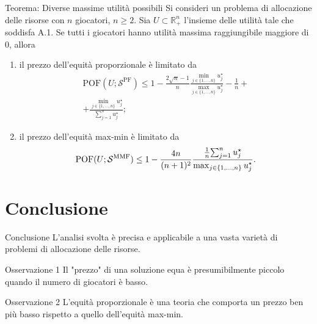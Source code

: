 \documentclass{beamer}
\begin{document}
\begin{frame}
	\begin{exampleblock}{Teorema: Diverse massime utilità possibili}
		\vspace{-0.1cm}
		Si consideri un problema di allocazione delle risorse con $n$ giocatori, $n \ge 2$. Sia $U \subset \mathbb{R}^n_+$ l'insieme delle utilità tale che soddisfa A.1. Se tutti i giocatori hanno utilità massima raggiungibile maggiore di $0$, allora
		\vspace{-0.1cm}
		\begin{enumerate}
			\item il prezzo dell'equità proporzionale è limitato da
			\vspace{-0.3cm}
			\begin{multline}
				\text{POF}(U;\mathcal{S}^{\text{PF}}) \le 1 - \frac{2 \sqrt{n} - 1}{n} \frac{\min_{j \in \{1,\dots,n\}} u_j^{\star} }{\max_{j \in \{1,\dots,n\}} u_j^{\star}} - \frac{1}{n} + \\ + \frac{\min_{j \in \{1,\dots,n\}} u_j^{\star}}{\sum_{j=1}^n u_j^{\star}};
			\end{multline}
			\item il prezzo dell'equità max-min è limitato da
			\vspace{-0.3cm}
			\begin{equation}
				\text{POF}(U;\mathcal{S}^{\text{MMF}}) \le 1 - \frac{4n}{(n+1)^2} \frac{\frac{1}{n}{\sum_{j=1}^n u_j^{\star}}}{\max_{j \in \{1,\dots,n\}} u_j^{\star}}.
				\vspace{-0.3cm}
			\end{equation}
		\end{enumerate}
	\vspace{-0.1cm}
	\end{exampleblock}
\end{frame}

\section{Conclusione}

\begin{frame}{Conclusione}
	L'analisi svolta è precisa e applicabile a una vasta varietà di problemi di allocazione delle risorse.
	\begin{exampleblock}{Osservazione 1}
		Il "prezzo" di una soluzione equa è presumibilmente piccolo quando il numero di giocatori è basso.
	\end{exampleblock}
	\begin{exampleblock}{Osservazione 2}
		L'equità proporzionale è una teoria che comporta un prezzo ben più basso rispetto a quello dell'equità max-min. 
	\end{exampleblock}
\end{frame}

%	
\end{document}
